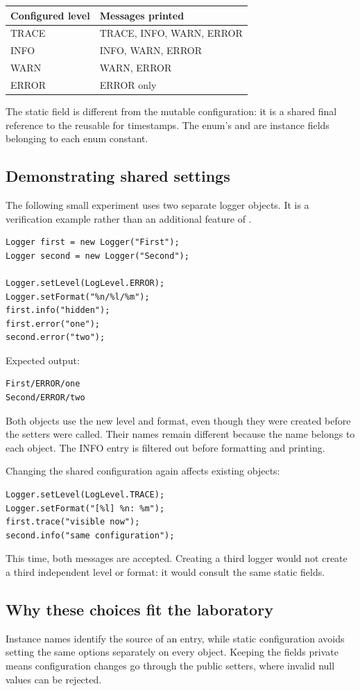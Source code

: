 \begin{tabularx}{\textwidth}{@{}lY@{}}
\toprule
\textbf{Configured level} & \textbf{Messages printed}\\
\midrule
TRACE & TRACE, INFO, WARN, ERROR\\
INFO & INFO, WARN, ERROR\\
WARN & WARN, ERROR\\
ERROR & ERROR only\\
\bottomrule
\end{tabularx}

The static  field is different from the mutable configuration: it is a shared final reference to the reusable  for  timestamps. The enum's  and  are instance fields belonging to each enum constant.

\newpage
\subsection{Demonstrating shared settings}
The following small experiment uses two separate logger objects. It is a verification example rather than an additional feature of .
\begin{lstlisting}
Logger first = new Logger("First");
Logger second = new Logger("Second");

Logger.setLevel(LogLevel.ERROR);
Logger.setFormat("%n/%l/%m");
first.info("hidden");
first.error("one");
second.error("two");
\end{lstlisting}
Expected output:
\begin{lstlisting}[language={}]
First/ERROR/one
Second/ERROR/two
\end{lstlisting}
Both objects use the new level and format, even though they were created before the setters were called. Their names remain different because the name belongs to each object. The INFO entry is filtered out before formatting and printing.

Changing the shared configuration again affects existing objects:
\begin{lstlisting}
Logger.setLevel(LogLevel.TRACE);
Logger.setFormat("[%l] %n: %m");
first.trace("visible now");
second.info("same configuration");
\end{lstlisting}
This time, both messages are accepted. Creating a third logger would not create a third independent level or format: it would consult the same static fields.

\subsection{Why these choices fit the laboratory}
Instance names identify the source of an entry, while static configuration avoids setting the same options separately on every object. Keeping the fields private means configuration changes go through the public setters, where invalid null values can be rejected.

